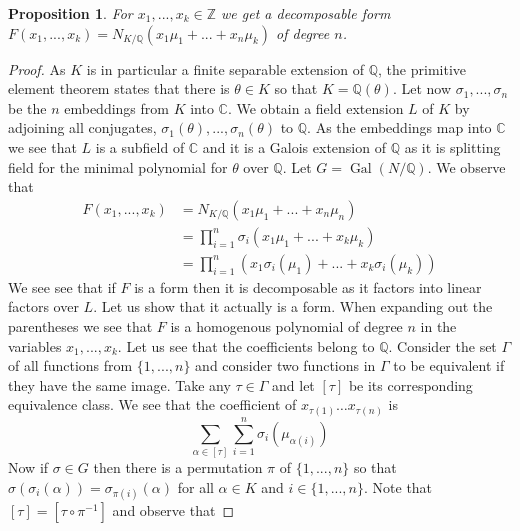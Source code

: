 \documentclass{article}
\DeclareMathOperator{\Gal}{Gal}
\newtheorem{proposition}{Proposition}[section]
\newcommand{\mbb}[1]{\mathbb{#1}}
\numberwithin{equation}{section}
\begin{document}
\begin{proposition}
    For $x_1, ..., x_k \in \mbb Z$ we get a decomposable form $F(x_1, ..., x_k) = N_{K / \mbb Q}(x_1 \mu_1 + ... + x_n \mu_k)$ of degree $n$. %
\end{proposition}
\begin{proof}
    
As $K$ is in particular a finite separable extension of $\mbb Q$, the primitive element theorem states that there is $\theta \in K$ so that $K = \mbb Q(\theta)$. Let now $\sigma_1, ..., \sigma_n$ be the $n$ embeddings from $K$ into $\mbb C$. We obtain a field extension $L$ of $K$ by adjoining all conjugates, $\sigma_1(\theta), ..., \sigma_n(\theta)$ to $\mbb Q$. As the embeddings map into $\mbb C$ we see that $L$ is a subfield of $\mbb C$ and it is a Galois extension of $\mbb Q$ as it is splitting field for the minimal polynomial for $\theta$ over $\mbb Q$. Let $G = \Gal(N/\mbb Q)$. We observe that
\begin{align*}
    F(x_1, ..., x_k) &= N_{K /\mbb Q}(x_1 \mu_1 + ... + x_n \mu_n) 
    \\ &= \prod_{i = 1}^n \sigma_i(x_1 \mu_1 + ... + x_k \mu_k)                         \\
                     & = \prod_{i = 1}^n \left(x_1 \sigma_i(\mu_1) + ... + x_k \sigma_i(\mu_k) \right)
\end{align*}
We see see that if $F$ is a form then it is decomposable as it factors into linear factors over $L$. Let us show that it actually is a form. When expanding out the parentheses we see that $F$ is a homogenous polynomial of degree $n$ in the variables $x_1, ..., x_k$. Let us see that the coefficients belong to $\mbb Q$. Consider the set $\Gamma$ of all functions from $\{1, ..., n\}$ and consider two functions in $\Gamma$ to be equivalent if they have the same image. Take any $\tau \in \Gamma$ and let $[\tau]$ be its corresponding equivalence class. We see that the coefficient of $x_{\tau(1)} \ldots x_{\tau(n)}$ is 
\begin{equation}
    \sum_{\alpha \in [\tau]} \sum_{i=1}^n \sigma_i(\mu_{\alpha(i)})
\end{equation}
Now if $\sigma \in G$ then there is a permutation $\pi$ of $\{1, ..., n\}$ so that $\sigma(\sigma_{i}(\alpha)) = \sigma_{\pi(i)}(\alpha)$ for all $\alpha \in K$ and $i \in \{1,...,n\}$. Note that $[\tau]= [\tau \circ \pi^{-1}]$ and observe that

\end{proof}
\end{document}
